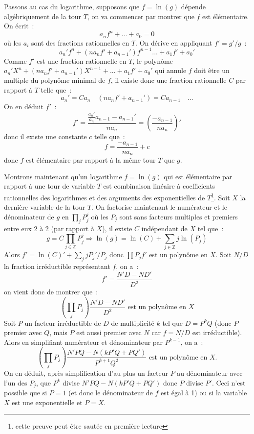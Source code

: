 \documentclass[a4paper,11pt]{book}
\begin{document}
\begin{giacjshere}
Passons au cas du logarithme, supposons que $f=\ln(g)$ dépende
algébriquement de la tour $T$, on va commencer par montrer que
$f$ est élémentaire. On écrit~:
\[ a_n f^n+...+a_0=0\]
où les $a_i$ sont des fractions rationnelles en $T$. On dérive en
appliquant $f'=g'/g$~:
\[ a_n' f^n + (n a_n f' + a_{n-1}')f^{n-1}  ... + a_1 f'+a_0 '\]
Comme $f'$ est une fraction rationnelle en $T$, le polynôme
$a_n' X^n + (n a_n f'+a_{n-1}') X^{n-1}+...+ a_1 f'+a_0'$ qui annule $f$
doit être un multiple du polynôme minimal de $f$, il existe donc
une fraction rationnelle $C$ par rapport à $T$ telle que~:
\[ a_n' = C a_n \quad (n a_n f'+a_{n-1}') = C a_{n-1} \quad ... \]
On en déduit $f'$~:
\[ f'=\frac{\frac{a_n'}{a_n} a_{n-1}-a_{n-1}'}{n a_n} = 
\left(\frac{-a_{n-1}}{n a_n}\right)'\]
donc il existe une constante $c$ telle que~:
\[ f=\frac{-a_{n-1}}{n a_n}+c\]
donc $f$ est élémentaire par rapport à la même tour $T$ que $g$.

Montrons maintenant qu'un logarithme $f=\ln(g)$ qui est élémentaire
par rapport à une tour de variable $T$ est combinaison linéaire à
coefficients rationnelles des logarithmes et des arguments
des exponentielles de $T$\footnote{cette preuve peut être sautée en première
lecture}.
Soit $X$ la dernière variable de la tour $T$.
On factorise maintenant le numérateur et le dénominateur de $g$ en
$\prod_j P_j^j$ où les $P_j$ sont sans facteurs multiples et 
premiers entre eux 2 à 2 (par rapport à $X$), il existe
$C$ indépendant de $X$ tel que~:
\begin{equation} \label{eq:g}
 g=C\prod_{j \in \mathbb{Z}} P_j ^{j} \Rightarrow 
\ln(g)=\ln(C)+\sum_{j \in \mathbb{Z}} j \ln(P_j)
\end{equation}
Alors $f'=\ln(C)'+\sum_j j P_j'/P_j$ donc $\prod P_j f'$ est un 
polynôme en $X$. 
Soit $N/D$ la fraction irréductible représentant $f$, on a~:
\[ f'=\frac{N' D -N D'}{D^2}\]
on vient donc de montrer que~:
\begin{equation} \label{eq:prodpj}
\left(\prod_j P_j \right) \frac{N' D - N D'}{D^2} 
\mbox{ est un polynôme en $X$}
\end{equation}
Soit $P$ un facteur irréductible de $D$ de multiplicité
$k$ tel que $D=P^k Q$ (donc $P$ premier avec $Q$, mais $P$ est aussi
premier avec $N$ car $f=N/D$ est irréductible). Alors en simplifiant
numérateur et dénominateur par $P^{k-1}$, on a~:
\begin{equation} \label{eq:estpolynome}
 \left( \prod_j P_j \right) \frac{N' P Q - N (kP'Q+PQ')}{ P^{k+1} Q^2} 
\mbox{ est un polynôme en $X$.} 
\end{equation}
On en déduit, après simplification d'au plus un facteur $P$ au dénominateur 
avec l'un des $P_j$, que $P^{k}$ divise 
$N' P Q - N (kP'Q+PQ')$ donc $P$ divise $P'$. Ceci n'est possible
que si $P=1$ (et donc le dénominateur de $f$ est égal à 1) 
ou si la variable $X$ est une exponentielle et $P=X$.


\end{giacjshere}
\end{document}
